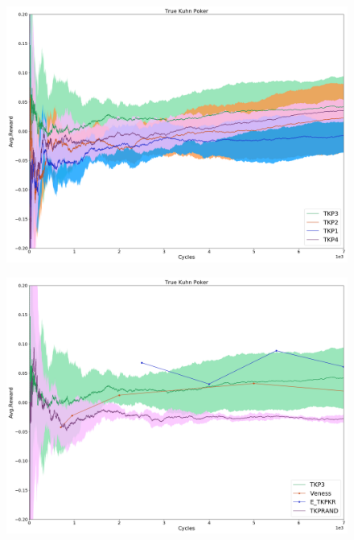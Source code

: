 \documentclass{article}
\theoremstyle{definition}
\newtheorem{primary statistics}[definition]{Primary Statistics}
\newtheorem{auxiliary statistics}[definition]{Auxiliary Statistics}
\begin{document}
 \begin{figure}[!htb]
 \centering
    \includegraphics[width=12.1cm]{4_True_Kuhn_Poker}
\end{figure}

 \begin{figure}[!htb]
 \centering
    \includegraphics[width=12.1cm]{True_Kuhn_Poker}
\end{figure}

\newpage
\end{document}
